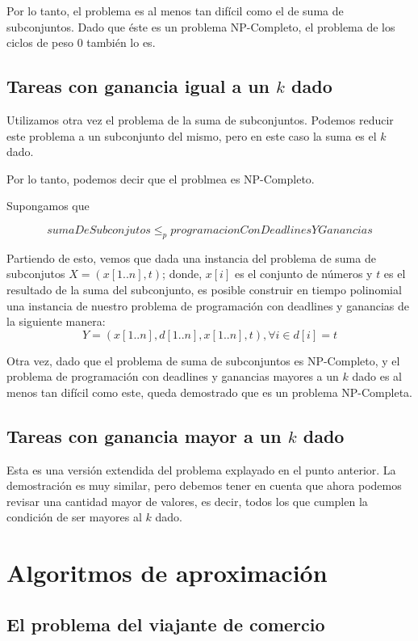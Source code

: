 \documentclass[a4paper,10pt]{article}
\begin{document}
\bigskip

Por lo tanto, el problema es al menos tan difícil como el de suma de subconjuntos. Dado que éste es un problema NP-Completo, el problema de los ciclos de peso 0 también lo es.

\subsection{Tareas con ganancia igual a un \(k\) dado}

Utilizamos otra vez el problema de la suma de subconjuntos. Podemos reducir este problema a un subconjunto del mismo, pero en este caso la suma es el \(k\) dado.

Por lo tanto, podemos decir que el problmea es NP-Completo.

Supongamos que

\[ sumaDeSubconjutos \le_{p} programacionConDeadlinesYGanancias \]

Partiendo de esto, vemos que dada una instancia del problema de suma de subconjutos \(X = (x[1..n], t)\); donde, \(x[i]\) es el conjunto de números y \(t\) es el resultado de la suma del subconjunto, es posible construir en tiempo polinomial una instancia de nuestro problema de programación con deadlines y ganancias de la siguiente manera: 
\[ Y = ( x[1..n], d[1..n], x[1..n], t ), \forall i \in d[i] = t \]

Otra vez, dado que el problema de suma de subconjuntos es NP-Completo, y el problema de programación con deadlines y ganancias mayores a un \(k\) dado es al menos tan difícil como este, queda demostrado que es un problema NP-Completa.

\subsection{Tareas con ganancia mayor a un \(k\) dado}

Esta es una versión extendida del problema explayado en el punto anterior. La demostración es muy similar, pero debemos tener en cuenta que ahora podemos revisar una cantidad mayor de valores, es decir, todos los que cumplen la condición de ser mayores al \(k\) dado.

\section{Algoritmos de aproximación}

\subsection{El problema del viajante de comercio}
\end{document}
